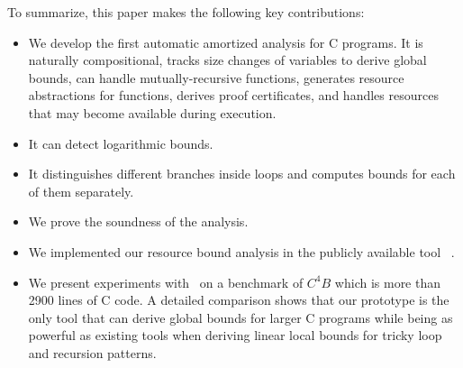To summarize, this paper makes the following key contributions:
\vspace{-0.1cm}
\begin{itemize}
	\item We develop the first automatic amortized analysis for C programs. It is naturally compositional, tracks size changes of variables to derive global bounds, can handle mutually-recursive
	functions, generates resource abstractions for functions, derives
	proof certificates, and handles resources that may become available during execution.
	
	\item It can detect logarithmic bounds.
	
	\item It distinguishes different branches inside loops and computes bounds for each of them separately.
	
	\item We prove the soundness of the analysis.
	
	\item We implemented our resource bound analysis in the publicly available tool \SystemName\ .
	\item We present experiments with \SystemName\ on a benchmark of $C^{4}B$ which is more than 2900 lines of C code. A detailed comparison shows that our prototype is the only tool that can derive global bounds for larger C programs while being as powerful as existing tools when deriving linear local bounds for tricky loop and recursion patterns.
\end{itemize}





